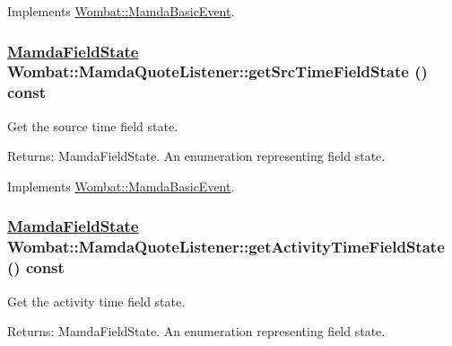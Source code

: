 Implements \hyperlink{classWombat_1_1MamdaBasicEvent_c361c99af2cf7eb9f5621d89f744fc62}{Wombat::Mamda\-Basic\-Event}.\hypertarget{classWombat_1_1MamdaQuoteListener_50550dbdc63d6a518052710d8414387c}{
\subsubsection[getSrcTimeFieldState]{\setlength{\rightskip}{0pt plus 5cm}\hyperlink{namespaceWombat_93aac974f2ab713554fd12a1fa3b7d2a}{Mamda\-Field\-State} Wombat::Mamda\-Quote\-Listener::get\-Src\-Time\-Field\-State () const}}
\label{classWombat_1_1MamdaQuoteListener_50550dbdc63d6a518052710d8414387c}


Get the source time field state. 

\begin{Desc}
\item[Returns:]Mamda\-Field\-State. An enumeration representing field state. \end{Desc}


Implements \hyperlink{classWombat_1_1MamdaBasicEvent_9cd58f3d7b5ebea42fa86e5dde46ab18}{Wombat::Mamda\-Basic\-Event}.\hypertarget{classWombat_1_1MamdaQuoteListener_79f601394c430d4883bcb41f0b470b29}{
\subsubsection[getActivityTimeFieldState]{\setlength{\rightskip}{0pt plus 5cm}\hyperlink{namespaceWombat_93aac974f2ab713554fd12a1fa3b7d2a}{Mamda\-Field\-State} Wombat::Mamda\-Quote\-Listener::get\-Activity\-Time\-Field\-State () const}}
\label{classWombat_1_1MamdaQuoteListener_79f601394c430d4883bcb41f0b470b29}


Get the activity time field state. 

\begin{Desc}
\item[Returns:]Mamda\-Field\-State. An enumeration representing field state. \end{Desc}


